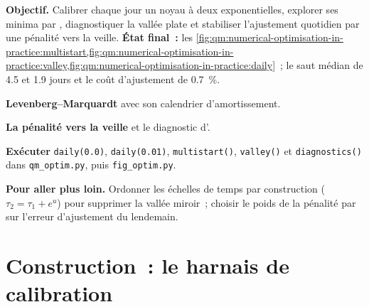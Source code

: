 \begin{tutorial}
\textbf{Objectif.} Calibrer chaque jour un noyau à deux exponentielles, explorer ses minima par , diagnostiquer la vallée plate et stabiliser l'ajustement quotidien par une pénalité vers la veille.
\textbf{État final~:} les \cref{fig:qm:numerical-optimisation-in-practice:multistart,fig:qm:numerical-optimisation-in-practice:valley,fig:qm:numerical-optimisation-in-practice:daily}~; le saut médian de
4.5 et 1.9 jours et le coût d'ajustement de 0.7~\%.
\begin{tutsteps}
\item \textbf{Levenberg--Marquardt} avec son calendrier d'amortissement.
\label{lst:qm:numerical-optimisation-in-practice:lm}
\item \textbf{La pénalité vers la veille} et le diagnostic d'.
\label{lst:qm:numerical-optimisation-in-practice:tikhonov}
\item \textbf{Exécuter} \texttt{daily(0.0)}, \texttt{daily(0.01)}, \texttt{multistart()}, \texttt{valley()} et \texttt{diagnostics()} dans \texttt{qm\_optim.py}, puis \texttt{fig\_optim.py}.
\end{tutsteps}
\textbf{Pour aller plus loin.} Ordonner les échelles de temps par construction ($\tau_2 = \tau_1 + e^u$) pour supprimer la vallée miroir~; choisir le poids de la pénalité par  sur l'erreur d'ajustement du lendemain.
\end{tutorial}

\section{Construction~: le harnais de calibration}\label{bld:qm:numerical-optimisation-in-practice:optim}

